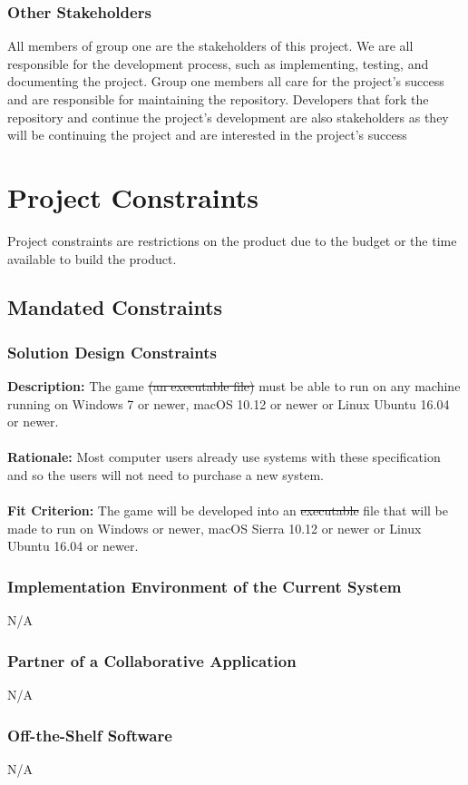 \documentclass[12pt]{article}
\begin{document}
	\subsubsection{Other Stakeholders}
	All members of group one are the stakeholders of this project. We are all responsible for the development process, such as implementing, testing, and documenting the project. Group one members all care for the project's success and are responsible for maintaining the repository. Developers that fork the repository and continue the project's development are also stakeholders as they will be continuing the project and are interested in the project's success
	
	
	\section{Project Constraints}
	Project constraints are restrictions on the product due to the budget or the 
	time available to build the product.
	\subsection{Mandated Constraints}
	\subsubsection{Solution Design Constraints}
	\textbf{Description:} The game \sout{(an executable file)} must be able to run on any machine running on Windows 7 or newer, macOS 10.12 or newer or Linux Ubuntu  16.04 or newer.
	\\ \\
	\textbf{Rationale:} Most computer users already use systems with these specification and so the users will not need to purchase a new system. \\ \\
	\textbf{Fit Criterion:} The game will be developed into an \sout{executable} file that will be made to run on Windows or newer, macOS Sierra 10.12 or newer or Linux Ubuntu 16.04 or newer.
	\subsubsection{Implementation Environment of the Current System}
	N/A
	\subsubsection{Partner of a Collaborative Application}
	N/A
	\subsubsection{Off-the-Shelf Software}
	N/A
\end{document}

